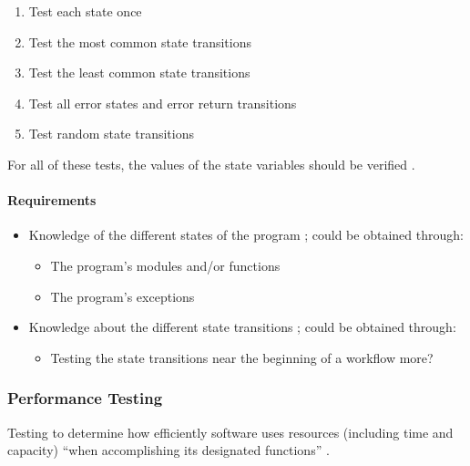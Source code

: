 \begin{enumerate}
      \item Test each state once
      \item Test the most common state transitions
      \item Test the least common state transitions
      \item Test all error states and error return transitions
      \item Test random state transitions
            \citep[pp.~82-83]{Patton2006}
\end{enumerate}

For all of these tests, the values of the state variables should be verified
\citep[p.~83]{Patton2006}.

\paragraph{Requirements}
\begin{itemize}
      \item Knowledge of the different states of the program
            \citep[p.~82]{Patton2006}; could be obtained through:
            \begin{itemize}
                  \item The program's modules and/or functions
                  \item The program's exceptions
            \end{itemize}
      \item Knowledge about the different state transitions
            \citep[p.~82]{Patton2006}; could be obtained through:
            \begin{itemize}
                  \item Testing the state transitions near the beginning of a
                        workflow more?
            \end{itemize}
\end{itemize}

\subsubsection{Performance Testing}

Testing to determine how efficiently software uses resources (including time
and capacity) ``when accomplishing its designated functions''
. 


